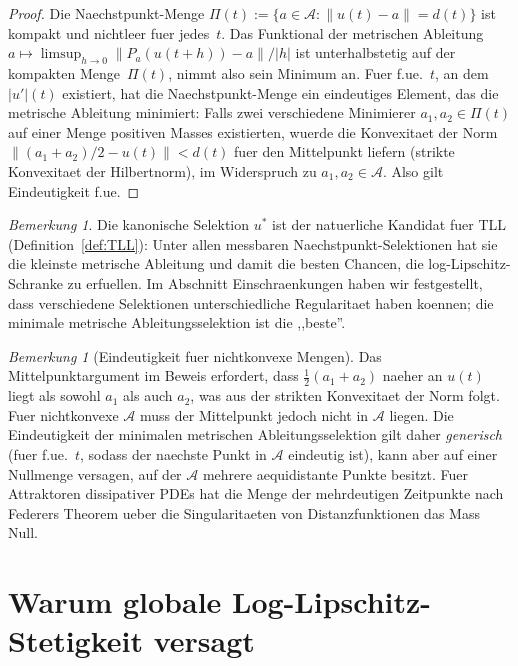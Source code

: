 \documentclass[12pt,a4paper]{article}
\theoremstyle{definition}
\theoremstyle{plain}
\theoremstyle{remark}
\newtheorem{remark}[definition]{Bemerkung}
\begin{document}
\begin{proof}
Die Naechstpunkt-Menge $\Pi(t) := \{a \in \mathcal{A} :
\|u(t)-a\| = d(t)\}$ ist kompakt und nichtleer fuer jedes~$t$.
Das Funktional der metrischen Ableitung $a \mapsto
\limsup_{h\to 0}\|P_{a}(u(t+h)) - a\|/|h|$ ist unterhalbstetig auf
der kompakten Menge~$\Pi(t)$, nimmt also sein Minimum an. Fuer
f.ue.~$t$, an dem $|u'|(t)$ existiert, hat die Naechstpunkt-Menge
ein eindeutiges Element, das die metrische Ableitung minimiert: Falls
zwei verschiedene Minimierer $a_1, a_2 \in \Pi(t)$ auf einer Menge
positiven Masses existierten, wuerde die Konvexitaet der Norm
$\|(a_1+a_2)/2 - u(t)\| < d(t)$ fuer den Mittelpunkt liefern
(strikte Konvexitaet der Hilbertnorm), im Widerspruch zu
$a_1,a_2 \in \mathcal{A}$. Also gilt Eindeutigkeit f.ue.
\end{proof}

\begin{remark}
Die kanonische Selektion $u^*$ ist der natuerliche Kandidat fuer TLL
(Definition~\ref{def:TLL}): Unter allen messbaren
Naechstpunkt-Selektionen hat sie die kleinste metrische Ableitung
und damit die besten Chancen, die log-Lipschitz-Schranke zu erfuellen.
Im Abschnitt Einschraenkungen haben wir festgestellt, dass verschiedene
Selektionen unterschiedliche Regularitaet haben koennen; die minimale
metrische Ableitungsselektion ist die ,,beste''.
\end{remark}

\begin{remark}[Eindeutigkeit fuer nichtkonvexe Mengen]\label{rem:uniqueness-caveat}
Das Mittelpunktargument im Beweis erfordert, dass $\frac{1}{2}(a_1 + a_2)$ naeher an $u(t)$ liegt als sowohl $a_1$ als auch $a_2$, was aus der strikten Konvexitaet der Norm folgt. Fuer nichtkonvexe $\mathcal{A}$ muss der Mittelpunkt jedoch nicht in $\mathcal{A}$ liegen. Die Eindeutigkeit der minimalen metrischen Ableitungsselektion gilt daher \emph{generisch} (fuer f.ue.~$t$, sodass der naechste Punkt in $\mathcal{A}$ eindeutig ist), kann aber auf einer Nullmenge versagen, auf der $\mathcal{A}$ mehrere aequidistante Punkte besitzt. Fuer Attraktoren dissipativer PDEs hat die Menge der mehrdeutigen Zeitpunkte nach Federers Theorem ueber die Singularitaeten von Distanzfunktionen das Mass Null.
\end{remark}


\section{Warum globale Log-Lipschitz-Stetigkeit versagt}
\label{sec:counterexample}
\end{document}

